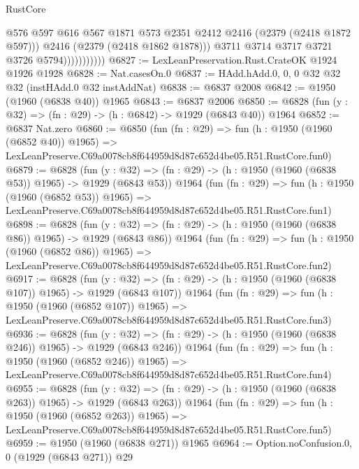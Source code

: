 \begin{lexlean}{RustCore}
\begin{coremodule}
                              @576
                              @597
                              @616
                              @567
                              @1871
                              @573
                              @2351
                              @2412
                              @2416
                              (@2379 (@2418 @1872 @597)))
                            @2416
                            (@2379 (@2418 @1862 @1878)))
                          @3711
                          @3714
                          @3717
                          @3721
                          @3726
                          @5794)))))))))))
@6827 := LexLeanPreservation.Rust.CrateOK @1924 @1926 @1928
@6828 := Nat.casesOn.{0}
@6837 := HAdd.hAdd.{0, 0, 0} @32 @32 @32 (instHAdd.{0} @32 instAddNat)
@6838 := @6837 @2008
@6842 := @1950 (@1960 (@6838 @40)) @1965
@6843 := @6837 @2006
@6850 := @6828 (fun (y : @32) => (fn : @29) -> (h : @6842) -> @1929 (@6843 @40)) @1964
@6852 := @6837 Nat.zero
@6860 := @6850
    (fun (fn : @29) =>
    fun (h : @1950 (@1960 (@6852 @40)) @1965) =>
    LexLeanPreserve.C69a0078cb8f644959d8d87c652d4be05.R51.RustCore.fun0)
@6879 := @6828
    (fun (y : @32) => (fn : @29) -> (h : @1950 (@1960 (@6838 @53)) @1965) -> @1929 (@6843 @53))
    @1964
    (fun (fn : @29) =>
    fun (h : @1950 (@1960 (@6852 @53)) @1965) =>
    LexLeanPreserve.C69a0078cb8f644959d8d87c652d4be05.R51.RustCore.fun1)
@6898 := @6828
    (fun (y : @32) => (fn : @29) -> (h : @1950 (@1960 (@6838 @86)) @1965) -> @1929 (@6843 @86))
    @1964
    (fun (fn : @29) =>
    fun (h : @1950 (@1960 (@6852 @86)) @1965) =>
    LexLeanPreserve.C69a0078cb8f644959d8d87c652d4be05.R51.RustCore.fun2)
@6917 := @6828
    (fun (y : @32) => (fn : @29) -> (h : @1950 (@1960 (@6838 @107)) @1965) -> @1929 (@6843 @107))
    @1964
    (fun (fn : @29) =>
    fun (h : @1950 (@1960 (@6852 @107)) @1965) =>
    LexLeanPreserve.C69a0078cb8f644959d8d87c652d4be05.R51.RustCore.fun3)
@6936 := @6828
    (fun (y : @32) => (fn : @29) -> (h : @1950 (@1960 (@6838 @246)) @1965) -> @1929 (@6843 @246))
    @1964
    (fun (fn : @29) =>
    fun (h : @1950 (@1960 (@6852 @246)) @1965) =>
    LexLeanPreserve.C69a0078cb8f644959d8d87c652d4be05.R51.RustCore.fun4)
@6955 := @6828
    (fun (y : @32) => (fn : @29) -> (h : @1950 (@1960 (@6838 @263)) @1965) -> @1929 (@6843 @263))
    @1964
    (fun (fn : @29) =>
    fun (h : @1950 (@1960 (@6852 @263)) @1965) =>
    LexLeanPreserve.C69a0078cb8f644959d8d87c652d4be05.R51.RustCore.fun5)
@6959 := @1950 (@1960 (@6838 @271)) @1965
@6964 := Option.noConfusion.{0, 0} (@1929 (@6843 @271)) @29

\end{coremodule}
\end{lexlean}
